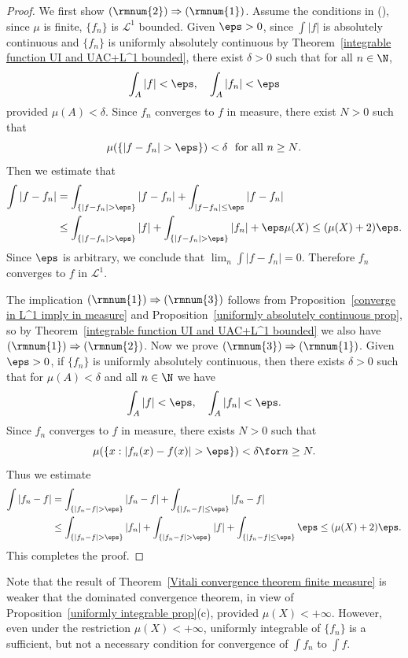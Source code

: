 \begin{proof}
We first show $(\rmnum{2})\Rightarrow(\rmnum{1})$. Assume the conditions in (), since $\mu$ is finite, $\{f_n\}$ is $\mathcal{L}^1$ bounded. Given $\eps>0$, since $\int|f|$ is absolutely continuous and $\{f_n\}$ is uniformly absolutely continuous by Theorem~\ref{integrable function UI and UAC+L^1 bounded}, there exist $\delta>0$ such that for all $n\in\N$,
\[\int_{A}|f|<\eps,\quad \int_{A}|f_n|<\eps\]
provided $\mu(A)<\delta$. Since $f_n$ converges to $f$ in measure, there exist $N>0$ such that
\[\mu(\{|f-f_n|>\eps\})<\delta\ \ \text{for all $n\geq N$}.\]
Then we estimate that
\begin{align*}
\int|f-f_n|&=\int_{\{|f-f_n|>\eps\}}|f-f_n|+\int_{|f-f_n|\leq\eps}|f-f_n|\\
&\leq \int_{\{|f-f_n|>\eps\}}|f|+\int_{\{|f-f_n|>\eps\}}|f_n|+\eps\mu(X)\leq (\mu(X)+2)\eps.
\end{align*}
Since $\eps$ is arbitrary, we conclude that $\lim_n\int|f-f_n|=0$. Therefore $f_n$ converges to $f$ in $\mathcal{L}^1$. \par
The implication $(\rmnum{1})\Rightarrow(\rmnum{3})$ follows from Proposition~\ref{converge in L^1 imply in measure} and Proposition~\ref{uniformly absolutely continuous prop}, so by Theorem~\ref{integrable function UI and UAC+L^1 bounded} we also have $(\rmnum{1})\Rightarrow(\rmnum{2})$. Now we prove $(\rmnum{3})\Rightarrow(\rmnum{1})$. Given $\eps>0$, if $\{f_n\}$ is uniformly absolutely continuous, then there exists $\delta>0$ such that for $\mu(A)<\delta$ and all $n\in\N$ we have
\[\int_{A}|f|<\eps,\quad\int_{A}|f_n|<\eps.\]
Since $f_n$ converges to $f$ in measure, there exists $N>0$ such that
\[\mu(\{x:|f_n(x)-f(x)|>\eps\})<\delta\for n\geq N.\]
Thus we estimate
\begin{align*}
\int|f_n-f|&=\int_{\{|f_n-f|>\eps\}}|f_n-f|+\int_{\{|f_n-f|\leq\eps\}}|f_n-f|\\
&\leq\int_{\{|f_n-f|>\eps\}}|f_n|+\int_{\{|f_n-f|>\eps\}}|f|+\int_{\{|f_n-f|\leq\eps\}}\eps\leq(\mu(X)+2)\eps.
\end{align*}
This completes the proof.
\end{proof}
Note that the result of Theorem~\ref{Vitali convergence theorem finite measure} is weaker that the dominated convergence theorem, in view of Proposition~\ref{uniformly integrable prop}(c), provided $\mu(X)<+\infty$. However, even under the restriction $\mu(X)<+\infty$, uniformly integrable of $\{f_n\}$ is a sufficient, but not a necessary condition for convergence of $\int f_n$ to $\int f$.
